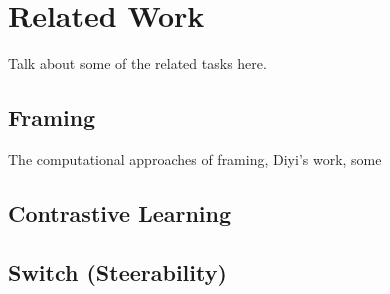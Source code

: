 \chapter{Related Work}
Talk about some of the related tasks here.
\section{Framing}
The computational approaches of framing, Diyi's work, some 
\section{Contrastive Learning}

\section{Switch (Steerability)}